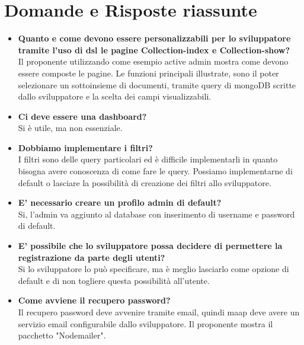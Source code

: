 \section{Domande e Risposte riassunte}
	\begin{itemize} 
		\item 
		{\bfseries Quanto e come devono essere personalizzabili per lo sviluppatore tramite l'uso di dsl le pagine Collection-index
		e Collection-show?} \\
		Il proponente utilizzando come esempio active admin mostra come devono essere composte le pagine.
		Le funzioni principali illustrate, sono il poter selezionare un sottoinsieme di documenti, tramite query di mongoDB scritte
		dallo sviluppatore e la scelta dei campi visualizzabili.	
		
		\item 
		{\bfseries Ci deve essere una dashboard?} \\
		Si è utile, ma non essenziale. 
		
		\item
		{\bfseries Dobbiamo implementare i filtri?} \\
		I filtri sono delle query particolari ed è difficile implementarli in quanto bisogna avere conoscenza di come fare le query.
		Possiamo implementarne di default o lasciare la possibilità di creazione dei filtri allo sviluppatore.
		
		\item
		{\bfseries E' necessario creare un profilo admin di default?} \\
		Si, l'admin va aggiunto al database con inserimento di username e password di default.
		
		\item
		{\bfseries E' possibile che lo sviluppatore possa decidere di permettere la registrazione da parte degli utenti?} \\
		 Si lo sviluppatore lo può specificare, ma è meglio lasciarlo come opzione di default e di non togliere questa possibilità
		 all'utente.
		
		\item
		{\bfseries Come avviene il recupero password?} \\
		Il recupero password deve avvenire tramite email, quindi maap deve avere un servizio email configurabile dallo sviluppatore.
		Il proponente mostra il pacchetto "Nodemailer".
		

\end{itemize}
